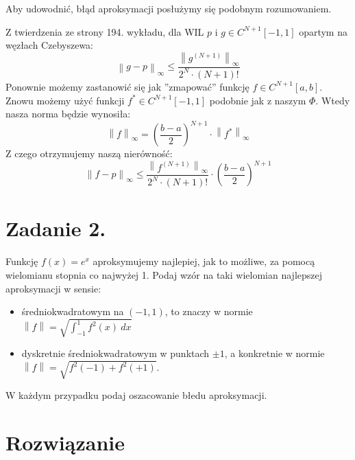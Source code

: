 \documentclass[a4paper]{article}
\renewcommand{\le}{\leqslant} %
\begin{document}
   Aby udowodnić, błąd aproksymacji posłużymy się podobnym rozumowaniem.

   Z twierdzenia ze strony 194. wykładu, dla WIL $p$ i $g \in C^{N+1}[-1, 1]$ opartym na węzłach Czebyszewa:
   \[
      \left\| g - p \right\|_{\infty} \le \frac{\left\| g^{(N+1)}\right\|_{\infty}}{2^{N} \cdot (N + 1)!}
   \]
   Ponownie możemy zastanowić się jak ''zmapować'' funkcję $f \in C^{N+1}[a, b]$.
   Znowu możemy użyć funkcji $f^{*} \in C^{N+1}[-1, 1]$ podobnie jak z naszym $\Phi$.
   Wtedy nasza norma będzie wynosiła:
   \[
      \left\| f \right\|_{\infty} = \left( \frac{b - a}{2} \right)^{N+1} \cdot \left\| f^{*} \right\|_{\infty}
   \]
   Z czego otrzymujemy naszą nierówność:
   \[
      \left\| f - p \right\|_{\infty} \le
      \frac{\left\| f^{(N+1)} \right\|_{\infty}}{2^{N} \cdot (N + 1)!} \cdot
      \left( \frac{b - a}{2} \right)^{N+1}
   \]

   \section*{Zadanie 2.}

   Funkcję $f(x) = e^{x}$ aproksymujemy najlepiej, jak to możliwe, za pomocą wielomianu stopnia co najwyżej 1.
   Podaj wzór na taki wielomian najlepszej aproksymacji w sensie:
   \begin{itemize}
      \item
      średniokwadratowym na $(-1, 1)$, to znaczy w normie
      $\left\| f \right\| = \sqrt{\int^{1}_{-1} f^{2}(x) \ dx}$

      \item
      dyskretnie średniokwadratowym w punktach $\pm 1$, a konkretnie w normie
      $\left\| f \right\| = \sqrt{f^{2}(-1) + f^{2}(+1)}$.
   \end{itemize}
   W każdym przypadku podaj oszacowanie błedu aproksymacji.


   \section*{\large Rozwiązanie}
\end{document}
